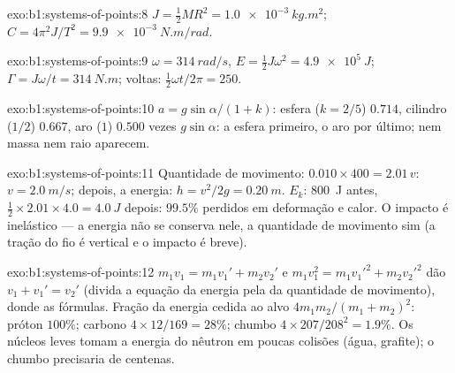 \begin{solution}{exo:b1:systems-of-points:8}
$J = \tfrac12 MR^2 = \qty{1.0e-3}{kg.m^2}$; $C = 4\pi^2J/T^2 = \qty{9.9e-3}{N.m/rad}$.
\end{solution}

\begin{solution}{exo:b1:systems-of-points:9}
$\omega = \qty{314}{rad/s}$, $E = \tfrac12 J\omega^2 = \qty{4.9e5}{J}$;
$\Gamma = J\omega/t = \qty{314}{N.m}$; voltas: $\tfrac12\omega t/2\pi = 250$.
\end{solution}

\begin{solution}{exo:b1:systems-of-points:10}
$a = g\sin\alpha/(1 + k)$: esfera ($k = 2/5$) $0.714$, cilindro ($1/2$)
$0.667$, aro ($1$) $0.500$ vezes $g\sin\alpha$: a esfera primeiro, o aro por
último; nem massa nem raio aparecem.
\end{solution}

\begin{solution}{exo:b1:systems-of-points:11}
Quantidade de movimento: $0.010 \times 400 = 2.01\,v$: $v = \qty{2.0}{m/s}$; depois, a energia:
$h = v^2/2g = \qty{0.20}{m}$. $E_k$: \qty{800}{J} antes, $\tfrac12 \times
2.01 \times 4.0 = \qty{4.0}{J}$ depois: $99.5\%$ perdidos em deformação e
calor. O impacto é inelástico --- a energia não se conserva nele, a
quantidade de movimento sim (a tração do fio é vertical e o impacto é breve).
\end{solution}

\begin{solution}{exo:b1:systems-of-points:12}
$m_1v_1 = m_1v_1' + m_2v_2'$ e $m_1v_1^2 = m_1v_1'^2 + m_2v_2'^2$ dão
$v_1 + v_1' = v_2'$ (divida a equação da energia pela da quantidade de movimento),
donde as fórmulas. Fração da energia cedida ao alvo $4m_1m_2/(m_1 + m_2)^2$:
próton $100\%$; carbono $4 \times 12/169 = 28\%$; chumbo $4 \times 207/208^2 =
1.9\%$. Os núcleos leves tomam a energia do nêutron em poucas colisões
(água, grafite); o chumbo precisaria de centenas.
\end{solution}

